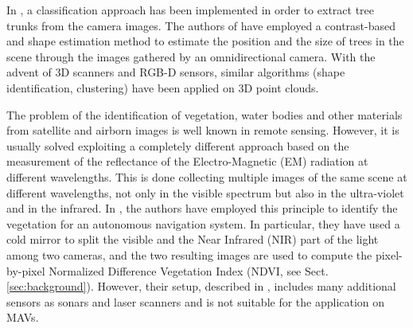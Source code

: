 \documentclass[a4paper, 10pt, conference]{ieeeconf}      %
\newcommand{\paolo}[1]{{\textcolor{red}{#1}}}
\begin{document}
%
%
In \cite{2008_AlGeHe}, a classification approach has been implemented in order to extract tree trunks from the camera images.
The authors of \cite{2011_YaRa} have employed a contrast-based and shape estimation method to estimate the position and the size of trees in the scene through the images gathered by an omnidirectional camera.
With the advent of 3D scanners and RGB-D sensors, similar algorithms (shape identification, clustering) have been applied \cite{2012_SoSuIa} on 3D point clouds.

The problem of the identification of vegetation, water bodies and other materials from satellite and airborn images is well known in remote sensing.
However, it is usually solved exploiting a completely different approach based on the measurement of the reflectance of the Electro-Magnetic (EM) radiation at different wavelengths.
This is done collecting multiple images of the same scene at different wavelengths, not only in the visible spectrum but also in the ultra-violet and in the infrared.
In \cite{2007_BrUnBa}, the authors have employed this principle to identify the vegetation for an autonomous navigation system.
In particular, they have used a cold mirror to split the visible and the Near Infrared (NIR) part of the light among two cameras, and the two resulting images are used to compute the pixel-by-pixel Normalized Difference Vegetation Index (NDVI, see Sect. \ref{sec:background}).
However, their setup, described in \cite{2006_Kelly}, includes many additional sensors as sonars and laser scanners and is not suitable for the application on MAVs.


\end{document}
